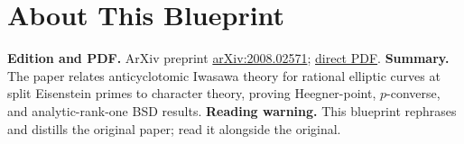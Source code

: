 

\chapter*{About This Blueprint}
\label{anticyclotomic-iwasawa-rational-elliptic-eisenstein-about}

\textbf{Edition and PDF.} ArXiv preprint \href{https://arxiv.org/abs/2008.02571}{arXiv:2008.02571};
\href{https://arxiv.org/pdf/2008.02571}{direct PDF}.
\textbf{Summary.} The paper relates anticyclotomic Iwasawa theory for rational elliptic curves at split Eisenstein primes
to character theory, proving Heegner-point, $p$-converse, and analytic-rank-one BSD results.
\textbf{Reading warning.} This blueprint rephrases and distills the original paper; read it alongside the original.











